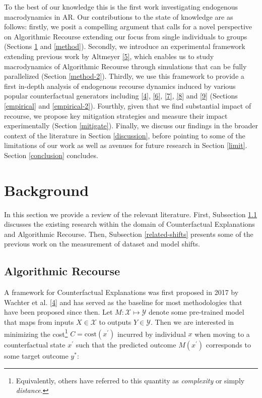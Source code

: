 \documentclass[conference,final,]{IEEEtran}
\theoremstyle{definition}
\theoremstyle{definition}
\theoremstyle{definition}
\theoremstyle{definition}
\theoremstyle{remark}
\begin{document}
To the best of our knowledge this is the first work investigating endogenous macrodynamics in AR. Our contributions to the state of knowledge are as follows: firstly, we posit a compelling argument that calls for a novel perspective on Algorithmic Recourse extending our focus from single individuals to groups (Sections \ref{related} and \ref{method}). Secondly, we introduce an experimental framework extending previous work by Altmeyer \protect\hyperlink{ref-altmeyer2022counterfactualexplanations}{{[}5{]}}, which enables us to study macrodynamics of Algorithmic Recourse through simulations that can be fully parallelized (Section \ref{method-2}). Thirdly, we use this framework to provide a first in-depth analysis of endogenous recourse dynamics induced by various popular counterfactual generators including \protect\hyperlink{ref-wachter2017counterfactual}{{[}4{]}}, \protect\hyperlink{ref-schut2021generating}{{[}6{]}}, \protect\hyperlink{ref-joshi2019realistic}{{[}7{]}}, \protect\hyperlink{ref-mothilal2020explaining}{{[}8{]}} and \protect\hyperlink{ref-antoran2020getting}{{[}9{]}} (Sections \ref{empirical} and \ref{empirical-2}). Fourthly, given that we find substantial impact of recourse, we propose key mitigation strategies and measure their impact experimentally (Section \ref{mitigate}). Finally, we discuss our findings in the broader context of the literature in Section \ref{discussion}, before pointing to some of the limitations of our work as well as avenues for future research in Section \ref{limit}. Section \ref{conclusion} concludes.

\hypertarget{related}{%
\section{Background}\label{related}}

In this section we provide a review of the relevant literature. First, Subsection \ref{related-recourse} discusses the existing research within the domain of Counterfactual Explanations and Algorithmic Recourse. Then, Subsection \ref{related-shifts} presents some of the previous work on the measurement of dataset and model shifts.

\hypertarget{related-recourse}{%
\subsection{Algorithmic Recourse}\label{related-recourse}}

A framework for Counterfactual Explanations was first proposed in 2017 by Wachter et al. \protect\hyperlink{ref-wachter2017counterfactual}{{[}4{]}} and has served as the baseline for most methodologies that have been proposed since then. Let \(M: \mathcal{X} \mapsto \mathcal{Y}\) denote some pre-trained model that maps from inputs \(X \in \mathcal{X}\) to outputs \(Y \in \mathcal{Y}\). Then we are interested in minimizing the cost\footnote{Equivalently, others have referred to this quantity as \emph{complexity} or simply \emph{distance}.} \(C=\text{cost}(x^\prime)\) incurred by individual \(x\) when moving to a counterfactual state \(x^\prime\) such that the predicted outcome \(M(x^\prime)\) corresponds to some target outcome \(y^*\):
\end{document}
